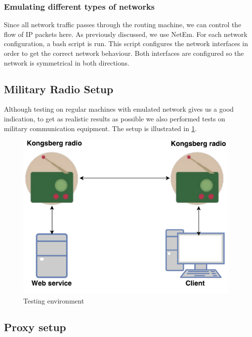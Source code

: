 \subsubsection{Emulating different types of networks}

Since all network traffic passes through the routing machine, we can control
the flow of IP packets here. As previously discussed, we use NetEm.  For each
network configuration, a bash script is run. This script configures the
network interfaces in order to get the correct network behaviour. Both
interfaces are configured so the network is symmetrical in both directions.

\subsection{Military Radio Setup}

Although testing on regular machines with emulated network gives us a good
indication, to get as realistic results as possible we also performed tests on
military communication equipment. The setup is illustrated in
\cref{figure-radio-testing-environment}.

\begin{figure}[h]
\centering
\includegraphics[scale=0.6]{images/radio_testing_environment.pdf}
\caption{Testing environment}
\label{figure-radio-testing-environment}
\end{figure}

\subsection{Proxy setup}


